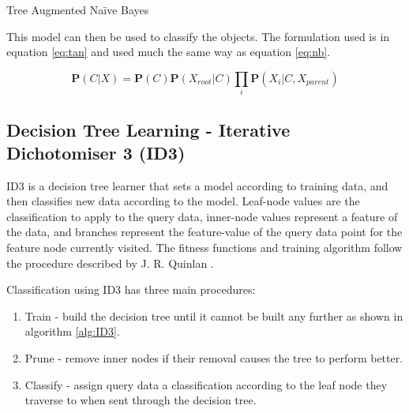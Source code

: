 \begin{algorithm}
\caption{Tree Augmented Na\"ive Bayes}\label{alg:TAN}
\begin{algorithmic}[1]
    \EndFor
\EndProcedure
\end{algorithmic}
\end{algorithm}

This model can then be used to classify the objects. The formulation used is in equation \ref{eq:tan} and used much the same way as equation \ref{eq:nb}.

\begin{equation}\label{eq:tan}
	\boldsymbol P(C | X) = \boldsymbol P(C) \boldsymbol P(X_{root} | C) \prod_{i} \boldsymbol P(X_i | C, X_{parent})
\end{equation}

\subsection{Decision Tree Learning - Iterative Dichotomiser 3 (ID3)} \label{subsec:ID3}
ID3 is a decision tree learner that sets a model according to training data, and then classifies new data according to the model.
Leaf-node values are the classification to apply to the query data, inner-node values represent a feature of the data, and branches represent the feature-value of the query data point for the feature node currently visited.
The fitness functions and training algorithm follow the procedure described by J. R. Quinlan \cite{Quinlan}.

Classification using ID3 has three main procedures:
\begin{enumerate}
	\item Train - build the decision tree until it cannot be built any further as shown in algorithm \ref{alg:ID3}.
    \item Prune - remove inner nodes if their removal causes the tree to perform better.
    \item Classify - assign query data a classification according to the leaf node they traverse to when sent through the decision tree.
\end{enumerate}

